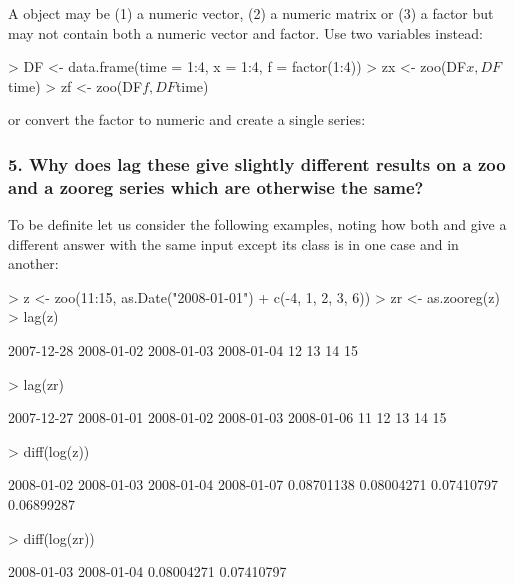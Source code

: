 \documentclass[article,nojss]{jss}
\newcommand{\mysection}[1]{\subsubsection[#1]{\textbf{#1}}}
\begin{document}
A  object may be (1) a numeric vector, (2) a numeric matrix or 
(3) a factor but may not contain both a numeric vector and factor.  
Use two  variables instead:

\begin{Schunk}
\begin{Sinput}
> DF <- data.frame(time = 1:4, x = 1:4, f = factor(1:4))
> zx <- zoo(DF$x, DF$time)
> zf <- zoo(DF$f, DF$time)
\end{Sinput}
\end{Schunk}

or convert the factor to numeric and create a single
 series:

\begin{Schunk}
\end{Schunk}

\mysection{5. Why does lag these give slightly different results on a zoo and a zooreg series which are otherwise the same?}

To be definite let us consider the following examples, noting how 
both  and  give a different answer with the same 
input except its class is  in one case and  in 
another:
\begin{Schunk}
\begin{Sinput}
> z <- zoo(11:15, as.Date("2008-01-01") + c(-4, 1, 2, 3, 6))
> zr <- as.zooreg(z)
> lag(z)
\end{Sinput}
\begin{Soutput}
2007-12-28 2008-01-02 2008-01-03 2008-01-04 
        12         13         14         15 
\end{Soutput}
\begin{Sinput}
> lag(zr)
\end{Sinput}
\begin{Soutput}
2007-12-27 2008-01-01 2008-01-02 2008-01-03 2008-01-06 
        11         12         13         14         15 
\end{Soutput}
\begin{Sinput}
> diff(log(z))
\end{Sinput}
\begin{Soutput}
2008-01-02 2008-01-03 2008-01-04 2008-01-07 
0.08701138 0.08004271 0.07410797 0.06899287 
\end{Soutput}
\begin{Sinput}
> diff(log(zr))
\end{Sinput}
\begin{Soutput}
2008-01-03 2008-01-04 
0.08004271 0.07410797 
\end{Soutput}
\end{Schunk}
\end{document}
